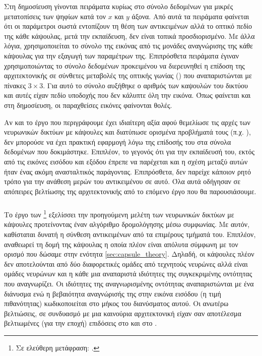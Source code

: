 Στη δημοσίευση γίνονται πειράματα κυρίως στο σύνολο δεδομένων \cite{lecun1998gradientMNIST} για μικρές μετατοπίσεις των ψηφίων κατά τον $x$ και $y$ άξονα. Από αυτά τα πειράματα φαίνεται ότι οι παράμετροι σωστά εντοπίζουν τη θέση των αντικειμένων αλλά το οπτικό πεδίο της κάθε κάψουλας, μετά την εκπαίδευση, δεν είναι τοπικά προσδιορισμένο. Με άλλα λόγια, χρησιμοποιείται το σύνολο της εικόνας από τις μονάδες αναγνώρισης της κάθε κάψουλας για την εξαγωγή των παραμέτρων της. Επιπρόσθετα πειράματα έγιναν χρησιμοποιώντας το σύνολο δεδομένων \cite{lecun2004learning} προκειμένου να διερευνηθεί η επίδοση της αρχιτεκτονικής σε σύνθετες μεταβολές της οπτικής γωνίας () που αναπαριστώνται με πίνακες $3\times3$. Για αυτό το σύνολο αυξήθηκε ο αριθμός των καψουλών του δικτύου και αυτές είχαν πεδίο υποδοχής που δεν κάλυπτε όλη την εικόνα. Όπως φαίνεται και στη δημοσίευση\cite{hinton2011transforming}, οι παραχθείσες εικόνες φαίνονται θολές.\par

Αν και το έργο που περιγράφουμε έχει ιδιαίτερη αξία αφού θεμελίωσε τις αρχές των νευρωνικών δικτύων με κάψουλες και διατύπωσε ορισμένα προβλήματά τους (π.χ. ), δεν μπορούσε να έχει πρακτική εφαρμογή λόγω της επίδοσής του στα σύνολα δεδομένων που δοκιμάστηκε. Επιπλέον, το γεγονός ότι για την εκπαίδευσή του, εκτός από τις εικόνες εισόδου και εξόδου έπρεπε να παρέχεται και η σχέση μεταξύ αυτών ήταν ένας ακόμη ανασταλτικός παράγοντας. Επιπρόσθετα, δεν παρείχε κάποιον ρητό τρόπο για την ανάθεση μερών του αντικειμένου σε αυτό. Όλα αυτά οδήγησαν σε απόπειρες βελτίωσης της αρχιτεκτονικής από το επόμενο έργο που θα παρουσιάσουμε. 

\subsubsection{}

Το έργο των \footnote{Σε ελεύθερη μετάφραση: .} \cite{sabour2017dynamic} εξελίσσει την προηγούμενη μελέτη των νευρωνικών δικτύων με κάψουλες προτείνοντας έναν αλγόριθμο δρομολόγησης μέσω συμφωνίας. Με αυτόν, καθίσταται δυνατή η σύνθεση αντικειμένων από τα επιμέρους τμήματά του. Επιπλέον, αναθεωρεί τη δομή της κάψουλας η οποία πλέον είναι απόλυτα σύμφωνη με τον ορισμό που δώσαμε στην ενότητα \ref{sec:capsule_theory}. Δηλαδή, οι κάψουλες πλέον δεν αποτελούνται από δύο διαφορετικές ομάδες από τεχνητούς νευρώνες αλλά είναι ομάδες νευρώνων και η κάθε μια αναπαριστά ιδιότητες της συγκεκριμένης οντότητας που αναγνωρίζει. Οι ιδιότητες της αναγνωρισμένης οντότητας αναπαριστώνται με ένα διάνυσμα ενώ η βεβαιότητα αναγνώρισής της στην εικόνα εισόδου (η τιμή πιθανότητας) κωδικοποιείται στο μήκος του διανύσματος αυτού. Οι ανωτέρω βελτιώσεις, σε συνδυασμό με μια καινούρια αρχιτεκτονική είχαν σαν αποτέλεσμα βελτιωμένες (για την εποχή) επιδόσεις στο \cite{lecun1998gradientMNIST} και στο \cite{sabour2017dynamic}.\par

